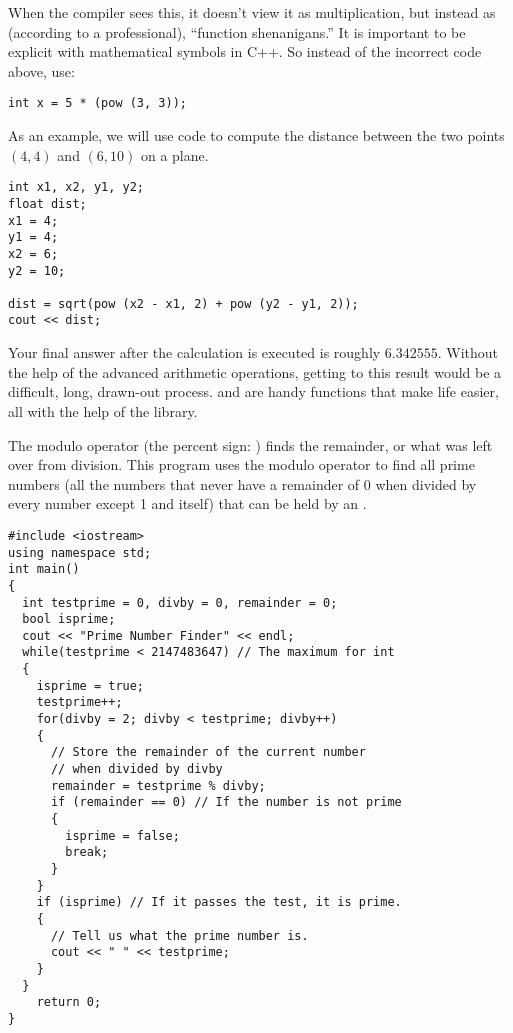 When the compiler sees this, it doesn't view it as multiplication, but instead as (according to a professional), ``function shenanigans.'' 
It is important to be explicit with mathematical symbols in C++. 
So instead of the incorrect code above, use:

\noindent\begin{minipage}{\linewidth}\begin{lstlisting}
int x = 5 * (pow (3, 3));
\end{lstlisting}\end{minipage}

As an example, we will use code to compute the distance between the two points $(4,4)$ and $(6, 10)$ on a plane.

\noindent\begin{minipage}{\linewidth}\begin{lstlisting}
int x1, x2, y1, y2;
float dist;
x1 = 4;
y1 = 4;
x2 = 6;
y2 = 10;

dist = sqrt(pow (x2 - x1, 2) + pow (y2 - y1, 2));
cout << dist;
\end{lstlisting}\end{minipage}
	
	Your final answer after the calculation is executed is roughly $6.342555$. 
	Without the help of the advanced arithmetic operations, getting to this result would be a difficult, long, drawn-out process. 
	 and  are handy functions that make life easier, all with the help of the  library.

The modulo operator (the percent sign: \Code{\%}) finds the remainder, or what was left over from division. 
This program uses the modulo operator to find all prime numbers (all the numbers that never have a remainder of 0 when divided by every number except 1 and itself) that can be held by an .

\noindent\begin{minipage}{\linewidth}\begin{lstlisting}
#include <iostream>
using namespace std;
int main()
{
  int testprime = 0, divby = 0, remainder = 0;
  bool isprime;
  cout << "Prime Number Finder" << endl;
  while(testprime < 2147483647) // The maximum for int
  {
    isprime = true;
    testprime++;
    for(divby = 2; divby < testprime; divby++)
    {
      // Store the remainder of the current number 
      // when divided by divby
      remainder = testprime % divby; 
      if (remainder == 0) // If the number is not prime
      {
        isprime = false;
        break;
      }
    }
    if (isprime) // If it passes the test, it is prime.
    {
      // Tell us what the prime number is.
      cout << " " << testprime; 
    }
  }
	return 0;
}
\end{lstlisting}\end{minipage}

